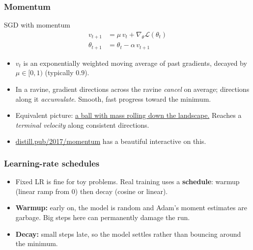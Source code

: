 \begin{frame}
\frametitle{Momentum}
\begin{block}{SGD with momentum}
\vspace{-0.3cm}
\begin{align*}
    v_{t+1} &= \mu\, v_t + \nabla_\theta \mathcal{L}(\theta_t) \\
    \theta_{t+1} &= \theta_t - \alpha\, v_{t+1}
\end{align*}
\end{block}
\begin{itemize}
    \pause
    \item $v_t$ is an exponentially weighted moving average of past gradients,
    decayed by $\mu \in [0,1)$ (typically $0.9$).
    \pause
    \item In a ravine, gradient directions across the ravine \emph{cancel}
    on average; directions along it \emph{accumulate}. Smooth, fast progress
    toward the minimum.
    \pause
    \item Equivalent picture: \href{https://miro.medium.com/v2/1*zVi4ayX9u0MQQwa90CnxVg.gif}{a ball with mass rolling down the landscape.}
    Reaches a \textit{terminal velocity} along consistent directions.
    \pause
    \item \href{https://distill.pub/2017/momentum/}{distill.pub/2017/momentum}
    has a beautiful interactive on this.
\end{itemize}
\end{frame}

\begin{frame}
\frametitle{Learning-rate schedules}
\begin{itemize}
    \item Fixed LR is fine for toy problems. Real training uses a
    \textbf{schedule}: warmup (linear ramp from 0) then decay (cosine or linear).
\end{itemize}
\begin{center}
\end{center}
\pause
\begin{itemize}
    \item \textbf{Warmup:} early on, the model is random and Adam's moment
    estimates are garbage. Big steps here can permanently damage the run.
    \pause
    \item \textbf{Decay:} small steps late, so the model settles rather than
    bouncing around the minimum.
\end{itemize}
\end{frame}

